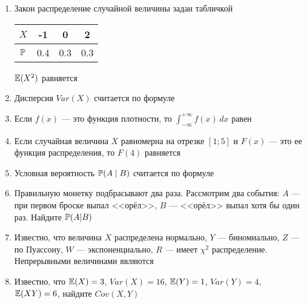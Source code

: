\documentclass[pdftex,12pt,a4paper]{article}
\begin{document}
\begin{enumerate}
\item Закон распределение случайной величины задан табличкой


\begin{tabular}{|c|c|c|c|}
\hline 
$X$ & -1 & 0 & 2 \\ 
\hline 
$\P$ & 0.4 & 0.3 & 0.3 \\ 
\hline 
\end{tabular} 


$\E(X^2)$ равняется


\item Дисперсия $Var(X)$ считается по формуле


\item Если $f(x)$ --- это функция плотности, то $\int_{-\infty}^{+\infty}f(x)\,dx$ равен

\item Если случайная величина $X$ равномерна на отрезке $[1;5]$ и $F(x)$ --- это ее функция распределения, то $F(4)$ равняется

\item Условная вероятность $\P(A\mid B)$ считается по формуле

\item Правильную монетку подбрасывают два раза. Рассмотрим два события: $A$ --- при первом броске выпал <<орёл>>, $B$ --- <<орёл>> выпал хотя бы один раз. Найдите $\P(A|B)$



\item Известно, что величина $X$ распределена нормально, $Y$ --- биномиально, $Z$ --- по Пуассону, $W$ --- экспоненциально, $R$ --- имеет $\chi^2$ распределение. Непрерывными величинами являются



\item Известно, что $\E(X)=3$, $Var(X)=16$, $\E(Y)=1$, $Var(Y)=4$, $\E(XY)=6$, найдите $Cov(X,Y)$


\end{enumerate}
\end{document}
